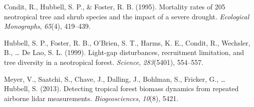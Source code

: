 \documentclass[11pt,]{article}
\begin{document}
\hypertarget{ref-condit1995mortality}{}
Condit, R., Hubbell, S. P., \& Foster, R. B. (1995). Mortality rates of
205 neotropical tree and shrub species and the impact of a severe
drought. \emph{Ecological Monographs}, \emph{65}(4), 419--439.

\hypertarget{ref-hubbell1999light}{}
Hubbell, S. P., Foster, R. B., O'Brien, S. T., Harms, K. E., Condit, R.,
Wechsler, B., \ldots{} De Lao, S. L. (1999). Light-gap disturbances,
recruitment limitation, and tree diversity in a neotropical forest.
\emph{Science}, \emph{283}(5401), 554--557.

\hypertarget{ref-meyer2013detecting}{}
Meyer, V., Saatchi, S., Chave, J., Dalling, J., Bohlman, S., Fricker,
G., \ldots{} Hubbell, S. (2013). Detecting tropical forest biomass
dynamics from repeated airborne lidar measurements.
\emph{Biogeosciences}, \emph{10}(8), 5421.




\newpage
\singlespacing 
\end{document}
